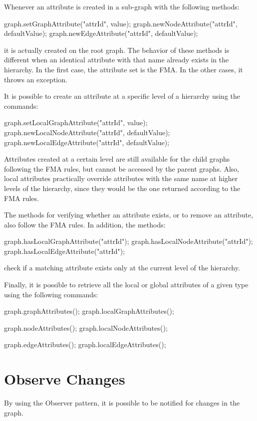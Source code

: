 Whenever an attribute is created in a sub-graph with the following methods:
\begin{java}
graph.setGraphAttribute("attrId", value);
graph.newNodeAttribute("attrId", defaultValue);
graph.newEdgeAttribute("attrId", defaultValue);
\end{java}
it is actually created on the root graph. The behavior of these methods is different when an identical attribute with that name already exists in the hierarchy. In the first case, the attribute set is the FMA. In the other cases, it throws an exception. 

It is possible to create an attribute at a specific level of a hierarchy using the commands:
\begin{java}
graph.setLocalGraphAttribute("attrId", value);
graph.newLocalNodeAttribute("attrId", defaultValue);
graph.newLocalEdgeAttribute("attrId", defaultValue);
\end{java}
Attributes created at a certain level are still available for the child graphs following the FMA rules, but cannot be accessed by the parent graphs. Also, local attributes practically override attributes with the same name at higher levels of the hierarchy, since they would be the one returned according to the FMA rules.

The methods for verifying whether an attribute exists, or to remove an attribute, also follow the FMA rules. In addition, the methods:
\begin{java}
graph.hasLocalGraphAttribute("attrId");
graph.hasLocalNodeAttribute("attrId");
graph.hasLocalEdgeAttribute("attrId");
\end{java}
check if a matching attribute exists only at the current level of the hierarchy.

Finally, it is possible to retrieve all the local or global attributes of a given type using the following commands:
\begin{java}
graph.graphAttributes();
graph.localGraphAttributes();

graph.nodeAttributes();
graph.localNodeAttributes();

graph.edgeAttributes();
graph.localEdgeAttributes();
\end{java}


\section{Observe Changes}
By using the Observer pattern, it is possible to be notified for changes in the graph.

